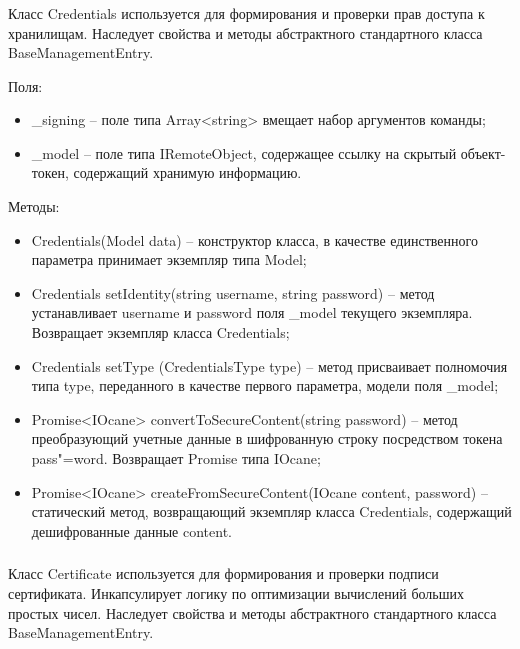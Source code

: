 \subsubsection{}
\label{sub:arch_and_mod:probab_net:credentials}

Класс Credentials используется для формирования и проверки прав доступа к хранилищам. Наследует свойства и методы абстрактного стандартного класса BaseManagementEntry.

Поля:
\begin{itemize}
  \item \_signing – поле типа Array<string> вмещает набор аргументов команды;
  \item \_model – поле типа IRemoteObject, содержащее ссылку на скрытый объект-токен, содержащий хранимую информацию.
\end{itemize}

Методы:
\begin{itemize}
  \item Credentials(Model data) – конструктор класса, в качестве единственного параметра принимает экземпляр типа Model;
  \item Credentials setIdentity(string username, string password) – метод устанавливает username и password поля \_model текущего экземпляра. Возвращает экземпляр класса Credentials;
  \item Credentials setType (CredentialsType type) – метод присваивает полномочия типа type, переданного в качестве первого параметра, модели поля \_model;
  \item Promise<IOcane> convertToSecureContent(string password) – метод преобразующий учетные данные в шифрованную строку посредством токена pass"=word. Возвращает Promise типа IOcane;
  \item Promise<IOcane> createFromSecureContent(IOcane content, password) – статический метод, возвращающий экземпляр класса Credentials, содержащий дешифрованные данные content.
\end{itemize}

\subsubsection{}
\label{sub:arch_and_mod:probab_net:certificate}

Класс Certificate используется для формирования и проверки подписи сертификата. Инкапсулирует логику по оптимизации вычислений больших простых чисел. Наследует свойства и методы абстрактного стандартного класса BaseManagementEntry.

